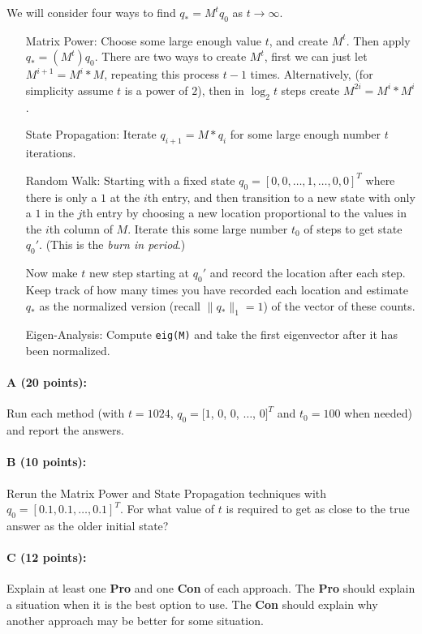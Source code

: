 \documentclass[11pt]{article}
\begin{document}
We will consider four ways to find $q_* = M^t q_0$ as $t \to \infty$.  

\begin{itemize} \denselist
\item[\textsf{Matrix Power:}] 
Choose some large enough value $t$, and create $M^t$.  Then apply $q_* = (M^t) q_0$.  
There are two ways to create $M^t$, first we can just let $M^{i+1} = M^i * M$, repeating this process $t-1$ times.  Alternatively, (for simplicity assume $t$ is a power of $2$), then in $\log_2 t$ steps create $M^{2i}  = M^i * M^i$.  
\item[\textsf{State Propagation:}]
Iterate $q_{i+1} = M * q_i$ for some large enough number $t$ iterations.  
\item[\textsf{Random Walk:}]
Starting with a fixed state $q_0 = [0, 0, \ldots, 1, \ldots, 0, 0]^T$ where there is only a $1$ at the $i$th entry, and then transition to a new state with only a $1$ in the $j$th entry by choosing a new location proportional to the values in the $i$th column of $M$.  
Iterate this some large number $t_0$ of steps to get state $q_0'$.  (This is the \emph{burn in period}.)

Now make $t$ new step starting at $q_0'$ and record the location after each step.  Keep track of how many times you have recorded each location and estimate $q_*$ as the normalized version (recall $\|q_*\|_1 = 1$) of the vector of these counts.  
\item[\textsf{Eigen-Analysis:}]
Compute \texttt{eig(M)} and take the first eigenvector after it has been normalized.  
\end{itemize}

\paragraph{A (20 points):}
Run each method (with $t = 1024$, $q_0 = [1$, $0$, $0$, $\ldots$, $0]^T$ and $t_0 = 100$ when needed) and report the answers.  

\paragraph{B (10 points):}
Rerun the \textsf{Matrix Power} and \textsf{State Propagation} techniques with $q_0 = [0.1, 0.1, \ldots, 0.1]^T$.  For what value of $t$ is required to get as close to the true answer as the older initial state?

\paragraph{C (12 points):}
Explain at least one \textbf{Pro} and one \textbf{Con} of each approach.  
The \textbf{Pro} should explain a situation when it is the best option to use.  
The \textbf{Con} should explain why another approach may be better for some situation.  
\end{document}
